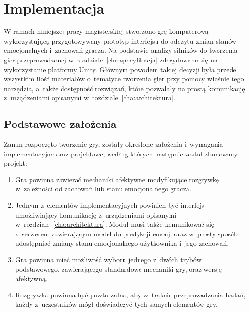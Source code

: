 \chapter{Implementacja}
\label{cha:implementacja}
W ramach niniejszej pracy magisterskiej stworzono grę komputerową wykorzystującą przygotowywany prototyp interfejsu do  odczytu zmian stanów emocjonalnych i~zachowań gracza. Na podstawie analizy silników do tworzenia gier przeprowadzonej w~rozdziale~\ref{cha:specyfikacja} zdecydowano się na wykorzystanie platformy Unity. Głównym powodem takiej decyzji była przede wszystkim ilość materiałów o~tematyce tworzenia gier przy pomocy właśnie tego narzędzia, a~także dostępność rozwiązań, które pozwalały na prostą komunikację z~urządzeniami opisanymi w~rozdziale~\ref{cha:architektura}. 

\section{Podstawowe założenia}
Zanim rozpoczęto tworzenie gry, zostały określone założenia i~wymagania implementacyjne oraz projektowe, według których następnie został zbudowany projekt:
\begin{enumerate}
	\item Gra powinna zawierać mechaniki afektywne modyfikujące rozgrywkę w~zależności od zachowań lub stanu emocjonalnego gracza.
	\item Jednym z~elementów implementacyjnych powinien być interfejs umożliwiający komunikację z~urządzeniami opisanymi w~rozdziale~\ref{cha:architektura}. Moduł musi także komunikować się z~serwerem zawierającym model do predykcji emocji oraz w~prosty sposób udostępniać zmiany stanu emocjonalnego użytkownika i~jego zachowań. 
	\item Gra powinna mieć możliwość wyboru jednego z~dwóch trybów: podstawowego, zawierającego standardowe mechaniki gry, oraz wersję afektywną.
	\item Rozgrywka powinna być powtarzalna, aby w~trakcie przeprowadzania badań, każdy z~uczestników mógł doświadczyć tych samych elementów gry.
\end{enumerate}

